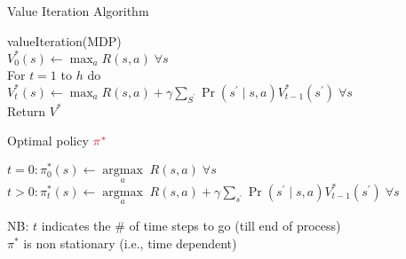\documentclass[11pt,table]{beamer}
\begin{document}
\begin{frame}{Value Iteration Algorithm}

    \begin{tcolorbox}[colframe=black, boxrule=1pt, sharp corners]
\textcolor{red1}{valueIteration(MDP)}\\
$V_{0}^{*}(s) \leftarrow \max _{a} R(s, a) \; \forall s$\\

For $t=1$ to $h$ do\\
\hspace*{5mm} $
V_{t}^{*}(s) \leftarrow \max _{a} R(s, a)+\gamma \sum_{S^{\prime}} \operatorname{Pr}\left(s^{\prime} \mid s, a\right) V_{t-1}^{*}\left(s^{\prime}\right)  \; \forall s
$\\

Return $V^{*}$
\end{tcolorbox}

\pause
Optimal policy $\textcolor{red1}{\pi^{*}}$

$t=0: \pi_{0}^{*}(s) \leftarrow \underset{a}{\operatorname{argmax}} \; R(s, a) \; \forall s$\\
\pause
$t>0: \pi_{t}^{*}(s) \leftarrow \underset{a}{\operatorname{argmax}} \; R(s, a)+\gamma \sum_{s^{\prime}} \operatorname{Pr}\left(s^{\prime} \mid s, a\right) V_{t-1}^{*}\left(s^{\prime}\right) \; \forall s$\\
\pause

NB: $t$ indicates the \# of time steps to go (till end of process)\\ $\pi^{*}$ is \textcolor{red1}{non stationary} (i.e., time dependent)
\end{frame}
\end{document}
